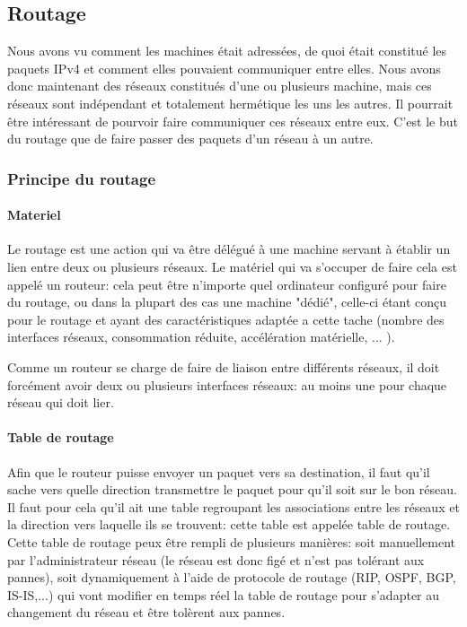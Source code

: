 \subsection{Routage}

Nous avons vu comment les machines était adressées, de quoi était constitué les
paquets IPv4 et comment elles pouvaient communiquer entre elles.  Nous avons
donc maintenant des réseaux constitués d'une ou plusieurs machine, mais ces
réseaux sont indépendant et totalement hermétique les uns les autres. Il
pourrait être intéressant de pourvoir faire communiquer ces réseaux entre eux.
C'est le but du routage que de faire passer des paquets d'un réseau à un autre.

\subsubsection{Principe du routage}

\paragraph{Materiel}
Le routage est une action qui va être délégué à une machine servant à établir
un lien entre deux ou plusieurs réseaux.  Le matériel qui va s'occuper de faire
cela est appelé un routeur: cela peut être n'importe quel ordinateur configuré
pour faire du routage, ou dans la plupart des cas une machine "dédié", celle-ci
étant conçu pour le routage et ayant des caractéristiques adaptée a cette tache
(nombre des interfaces réseaux, consommation réduite, accélération matérielle, ... ).

Comme un routeur se charge de faire de liaison entre différents réseaux, il doit
forcément avoir deux ou plusieurs interfaces réseaux: au moins une pour chaque
réseau qui doit lier.

\paragraph{Table de routage}
Afin que le routeur puisse envoyer un paquet vers sa destination, il faut qu'il
sache vers quelle direction transmettre le paquet pour qu'il soit sur le bon
réseau. Il faut pour cela qu'il ait une table regroupant les associations entre
les réseaux et la direction vers laquelle ils se trouvent: cette table est
appelée table de routage.  Cette table de routage peux être rempli de plusieurs
manières: soit manuellement par l'administrateur réseau (le réseau est donc
figé et n'est pas tolérant aux pannes), soit dynamiquement à l'aide de
protocole de routage (RIP, OSPF, BGP, IS-IS,...) qui vont modifier en temps
réel la table de routage pour s'adapter au changement du réseau et être
tolèrent aux pannes.

